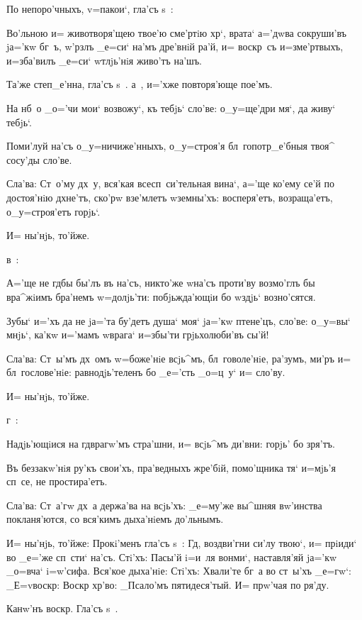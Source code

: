 По непоро'чныхъ, v=пакои`, гла'съ s~:

Во'льною и= животворя'щею твое'ю сме'ртiю хр`, 
врата` а='дwва сокруши'въ jа='кw бг~ъ, w'рзлъ _е=си` 
на'мъ дре'внiй ра'й, и= воскр~съ и=з\ъ ме'ртвыхъ, 
и=зба'вилъ _е=си` w\т тлjь'нiя живо'тъ на'шъ. 

Та'же степ_е'нна, гла'съ s~.  а~, и='хже 
повторя'юще пое'мъ.

На нб~о _о='чи мои` возвожу`, къ тебjь` сло'ве: 
о_у=ще'дри мя`, да живу` тебjь`.

Поми'луй на'съ о_у=ничиже'нныхъ, о_у=строя'я 
бл~гопотр_е'бныя твоя^ сосу'ды сло'ве.

Сла'ва: Ст~о'му дх~у, вся'кая всесп~си'тельная вина`, 
а='ще ко'ему се'й по достоя'нiю дхне'тъ, ско'рw взе'млетъ 
w\т земны'хъ: восперя'етъ, возраща'етъ, о_у=строя'етъ 
горjь`. 

И= ны'нjь, то'йже. 

 в~:

А='ще не гд бы бы'лъ въ на'съ, никто'же w\т на'съ 
проти'ву возмо'глъ бы вра^жiимъ бра'немъ w=долjь'ти: 
побjьжда'ющiи бо w\т здjь` возно'сятся.

Зубы` и='хъ да не jа='та бу'детъ душа` моя` jа='кw 
птене'цъ, сло'ве: о_у=вы` мнjь`, ка'кw и='мамъ w\т врага` 
и=збы'ти грjьхолюби'въ сы'й!

Сла'ва: Ст~ы'мъ дх~омъ w=боже'нiе всjь^мъ, 
бл~говоле'нiе, ра'зумъ, ми'ръ и= бл~гослове'нiе: 
равнодjь'теленъ бо _е='сть _о=ц~у` и= сло'ву. 

И= ны'нjь, то'йже. 

 г~:

Надjь'ющiися на гд врагw'мъ стра'шни, и= всjь^мъ 
ди'вни: горjь' бо зря'тъ.

Въ беззакw'нiя ру'къ свои'хъ, пра'ведныхъ жре'бiй, 
помо'щника тя` и=мjь'я сп~се, не простира'етъ.

Сла'ва: Ст~а'гw дх~а держа'ва на всjь'хъ: _е=му'же 
вы^шняя вw'инства покланя'ются, со вся'кимъ дыха'нiемъ 
до'льнымъ.

И= ны'нjь, то'йже: Прокi'менъ гла'съ s~: Гд, 
воздви'гни си'лу твою`, и= прiиди` во _е='же сп~сти` 
на'съ. Стi'хъ: Пасы'й i=и~ля вонми`, наставля'яй jа='кw 
_о=вча` i=w'сифа. Вся'кое дыха'нiе: Стi'хъ: Хвали'те бг~а 
во ст~ы'хъ _е=гw`: _Е=v воскр: Воскр 
хр'во: _Псало'мъ пятидеся'тый. И= прw'чая по ря'ду.

Канw'нъ воскр. Гла'съ s~.


